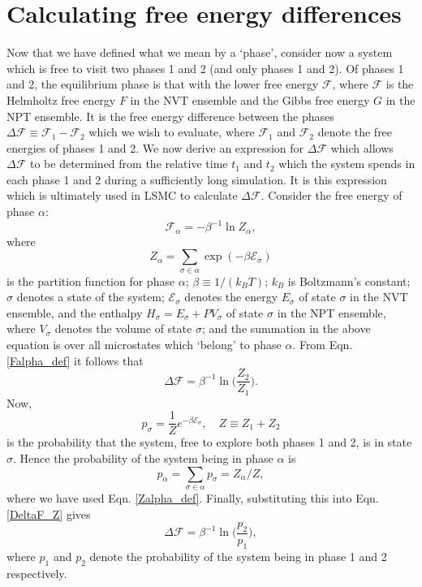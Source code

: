 \documentclass{report}
\begin{document}
\section{Calculating free energy differences}
Now that we have defined what we mean by a `phase', consider now a system which is free to visit two phases 1 and 2 (and only phases 1 and 2).
Of phases 1 and 2, the equilibrium phase is that with the lower free energy $\mathcal{F}$, where $\mathcal{F}$ is the Helmholtz free energy $F$ in the 
NVT ensemble and the Gibbs free energy $G$ in the NPT ensemble. It is the free energy difference between the phases 
$\Delta\mathcal{F}\equiv \mathcal{F}_1-\mathcal{F}_2$ which we wish to evaluate, where $\mathcal{F}_1$ and $\mathcal{F}_2$ denote the free energies of 
phases 1 and 2.
We now derive an expression for $\Delta \mathcal{F}$ which allows $\Delta \mathcal{F}$ to be determined from the relative time $t_1$ and $t_2$ which 
the system spends in each phase 1 and 2 during a sufficiently long simulation. It is this expression which is ultimately used in LSMC to calculate 
$\Delta \mathcal{F}$. Consider the free energy of phase $\alpha$:
\begin{equation}\label{Falpha_def}
\mathcal{F}_{\alpha}=-\beta^{-1}\ln Z_{\alpha},
\end{equation}
where
\begin{equation}\label{Zalpha_def}
Z_{\alpha}=\sum_{\sigma\in\alpha}\exp(-\beta \mathcal{E}_{\sigma})
\end{equation}
is the partition function for phase $\alpha$; $\beta\equiv 1/(k_BT)$; $k_B$ is Boltzmann's constant; $\sigma$ denotes a state of the system;
$\mathcal{E}_{\sigma}$ denotes the energy $E_{\sigma}$ of state $\sigma$ in the NVT ensemble, and the enthalpy $H_{\sigma}=E_{\sigma}+PV_{\sigma}$ of
state $\sigma$ in the NPT ensemble, where $V_{\sigma}$ denotes the volume of state $\sigma$; 
and the summation in the above equation is over all microstates which `belong' to phase $\alpha$. 
From Eqn. \eqref{Falpha_def} it follows that
\begin{equation}\label{DeltaF_Z}
\Delta \mathcal{F}=\beta^{-1}\ln\biggl(\frac{Z_2}{Z_1}\biggr).
\end{equation}
Now,
\begin{equation}\label{MC_prob}
p_{\sigma}=\frac{1}{Z}e^{-\beta \mathcal{E}_{\sigma}}, \quad Z\equiv Z_1+Z_2
\end{equation}
is the probability that the system, free to explore both phases 1 and 2, is in state $\sigma$. Hence the probability of the system being in
phase $\alpha$ is
\begin{equation}
p_{\alpha} = \sum_{\sigma\in \alpha}p_{\sigma} = Z_{\alpha}/Z,
\end{equation}
where we have used Eqn. \eqref{Zalpha_def}. Finally, substituting this into Eqn. \eqref{DeltaF_Z} gives
\begin{equation}\label{DeltaF_stat_mech}
\Delta \mathcal{F}=\beta^{-1}\ln\biggl(\frac{p_2}{p_1}\biggr),
\end{equation}
where $p_1$ and $p_2$ denote the probability of the system being in phase 1 and 2 respectively. 
\end{document}
